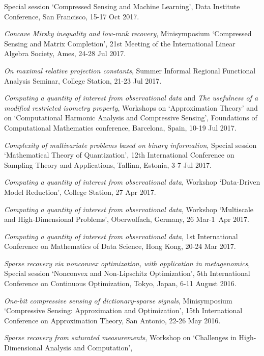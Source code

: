 \documentclass[11pt]{article}
\begin{document}
Special session `Compressed Sensing and Machine Learning', 
Data Institute Conference, San Francisco, 15-17 Oct 2017. 
\item {\sl Concave Mirsky inequality and low-rank recovery}, Minisymposium `Compressed Sensing and Matrix Completion',
21st Meeting of the International Linear Algebra Society, Ames, 24-28 Jul 2017.
\item {\sl On maximal relative projection constants}, Summer Informal Regional Functional Analysis Seminar,
College Station, 21-23 Jul 2017.
\item {\sl Computing a quantity of interest from observational data} and {\sl The usefulness of a modified restricted isometry property}, 
Workshops on `Approximation Theory' and on `Computational Harmonic Analysis and Compressive Sensing',
Foundations of Computational Mathematics conference, 
Barcelona, Spain, 10-19 Jul 2017.
\item {\sl Complexity of multivariate problems based on binary information},
Special session `Mathematical Theory of Quantization',
12th International Conference on Sampling Theory and Applications, 
Tallinn, Estonia, 3-7 Jul 2017.
\item {\sl Computing a quantity of interest from observational data},
Workshop `Data-Driven Model Reduction',
College Station, 27 Apr 2017.
\item {\sl Computing a quantity of interest from observational data},
Workshop `Multiscale and High-Dimensional Problems', Oberwolfach, Germany, 
26 Mar-1~Apr 2017.
\item {\sl Computing a quantity of interest from observational data}, 1st International Conference on Mathematics of Data Science,
Hong Kong, 20-24 Mar 2017.
\item {\sl Sparse recovery via nonconvex optimization, with application in metagenomics},
Special session `Nonconvex and Non-Lipschitz Optimization',
5th International Conference on Continuous Optimization, Tokyo, Japan, 6-11 August 2016.
\item{\sl One-bit compressive sensing of dictionary-sparse signals},
Minisymposium `Compressive Sensing: Approximation and Optimization',
15th International Conference on Approximation Theory, San Antonio, 22-26 May 2016.
\item {\sl Sparse recovery from saturated measurements},
Workshop on `Challenges in High-Dimensional Analysis and Computation',
\end{document}
